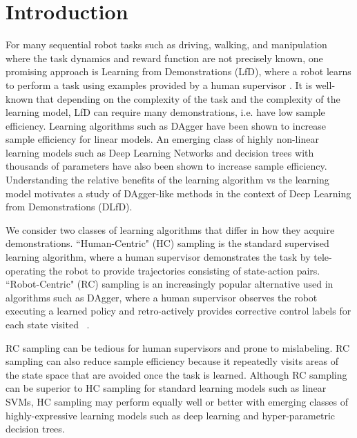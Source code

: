 \documentclass[10pt, conference]{ieeeconf}      %
\begin{document}
\section{Introduction} 
For many sequential robot tasks such as driving, walking, and manipulation where the task dynamics and reward function are not precisely known, one promising approach is Learning from Demonstrations (LfD), where a robot learns to perform a task using examples provided by a human supervisor \cite{pomerleau1989alvinn,abbeel2008apprenticeship,argall2009survey,ross2010reduction,laskeyshiv}. It is well-known that depending on the complexity of the task and the complexity of the learning model, LfD can require many demonstrations, i.e. have low sample efficiency. Learning algorithms such as DAgger have been shown to increase sample efficiency for linear models. An emerging class of highly non-linear learning models such as Deep Learning Networks and decision trees with thousands of parameters have also been shown to increase sample efficiency.  Understanding the relative benefits of the learning algorithm vs the learning model motivates a study of DAgger-like methods in the context of Deep Learning from Demonstrations (DLfD).

We consider two classes of learning algorithms that differ in how they acquire demonstrations. ``Human-Centric" (HC) sampling is the standard supervised learning algorithm, where a human supervisor demonstrates the task by tele-operating the robot to provide trajectories consisting of state-action pairs.  ``Robot-Centric" (RC) sampling is an increasingly popular alternative used in algorithms such as DAgger, where a human supervisor observes the robot executing a learned policy and retro-actively provides corrective control labels for each state visited ~\cite{ross2010efficient,ross2010reduction,laskeyrobot,laskeyshiv,he2012imitation}.  

RC sampling can be tedious for human supervisors and prone to mislabeling.  RC sampling can also reduce sample efficiency because it repeatedly visits areas of the state space that are avoided once the task is learned. Although RC sampling can be superior to HC sampling for standard learning models such as linear SVMs, HC sampling may perform equally well or better with emerging classes of highly-expressive learning models such as deep learning and hyper-parametric decision trees.
\end{document}
